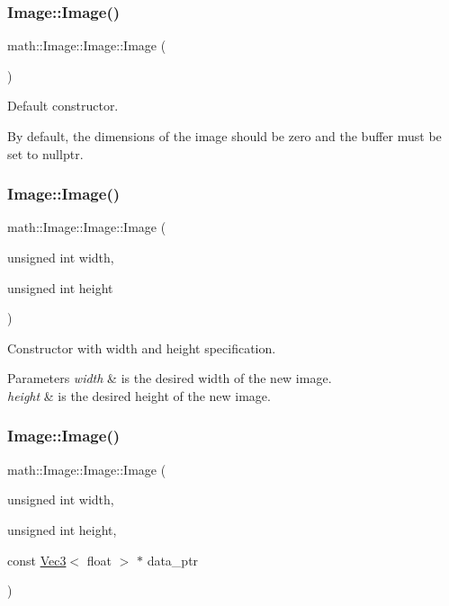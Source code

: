 \subsubsection{\texorpdfstring{Image\+::\+Image()}{Image::Image()}\hspace{0.1cm}{\footnotesize\ttfamily [1/4]}}
{\footnotesize\ttfamily math\+::\+Image\+::\+Image\+::\+Image (\begin{DoxyParamCaption}{ }\end{DoxyParamCaption})}

Default constructor.

By default, the dimensions of the image should be zero and the buffer must be set to nullptr. \mbox{\label{classmath_1_1_image_aae37c3657dd8d50277cd9eb9fa15ec7b}} 
\subsubsection{\texorpdfstring{Image\+::\+Image()}{Image::Image()}\hspace{0.1cm}{\footnotesize\ttfamily [2/4]}}
{\footnotesize\ttfamily math\+::\+Image\+::\+Image\+::\+Image (\begin{DoxyParamCaption}\item[{unsigned int}]{width,  }\item[{unsigned int}]{height }\end{DoxyParamCaption})}

Constructor with width and height specification.


\begin{DoxyParams}{Parameters}
{\em width} & is the desired width of the new image. \\
\hline
{\em height} & is the desired height of the new image. \\
\hline
\end{DoxyParams}
\mbox{\label{classmath_1_1_image_a5cccddb81385864de4c9365d3ac95596}} 
\subsubsection{\texorpdfstring{Image\+::\+Image()}{Image::Image()}\hspace{0.1cm}{\footnotesize\ttfamily [3/4]}}
{\footnotesize\ttfamily math\+::\+Image\+::\+Image\+::\+Image (\begin{DoxyParamCaption}\item[{unsigned int}]{width,  }\item[{unsigned int}]{height,  }\item[{const \hyperlink{classmath_1_1_vec3}{Vec3}$<$ float $>$ $\ast$}]{data\+\_\+ptr }\end{DoxyParamCaption})}

